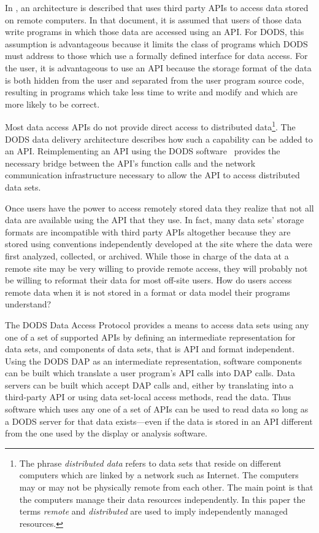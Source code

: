 In \DDA, an architecture is described that uses third party APIs to access
data stored on remote computers. In that document, it is assumed that users
of those data write programs in which those data are accessed using an API\@.
For DODS, this assumption is advantageous because it limits the class of
programs which DODS must address to those which use a formally defined
interface for data access. For the user, it is advantageous to use an API
because the storage format of the data is both hidden from the user and
separated from the user program source code, resulting in programs which take
less time to write and modify and which are more likely to be correct.

Most data access APIs do not provide direct access to distributed
data\footnote{The phrase {\em distributed data\/} refers to data sets that
reside on different computers which are linked by a network such as
Internet. The computers may or may not be physically remote from each other.
The main point is that the computers manage their data resources
independently. In this paper the terms {\em remote\/} and {\em distributed\/}
are used to imply independently managed resources.}. The DODS data delivery
architecture describes how such a capability can be added to an API\@.
Reimplementing an API using the DODS software \toolkit\ provides the
necessary bridge between the API's function calls and the network
communication infrastructure necessary to allow the API to access distributed
data sets.

Once users have the power to access remotely stored data they realize that
not all data are available using the API that they use. In fact, many data
sets' storage formats are incompatible with third party APIs altogether
because they are stored using conventions independently developed at the site
where the data were first analyzed, collected, or archived. While those in
charge of the data at a remote site may be very willing to provide remote
access, they will probably not be willing to reformat their data for most
off-site users.  How do users access remote data when it is not stored in a
format or data model their programs understand?

The DODS Data Access Protocol provides a means to access data sets using any
one of a set of supported APIs by defining an intermediate representation for
data sets, and components of data sets, that is API and format independent.
Using the DODS DAP as an intermediate representation, software components can
be built which translate a user program's API calls into DAP calls. Data
servers can be built which accept DAP calls and, either by translating
into a third-party API or using data set-local access methods, read the data.
Thus software which uses any one of a set of APIs can be used to read data so
long as a DODS server for that data exists---even if the data is stored in an
API different from the one used by the display or analysis software.

